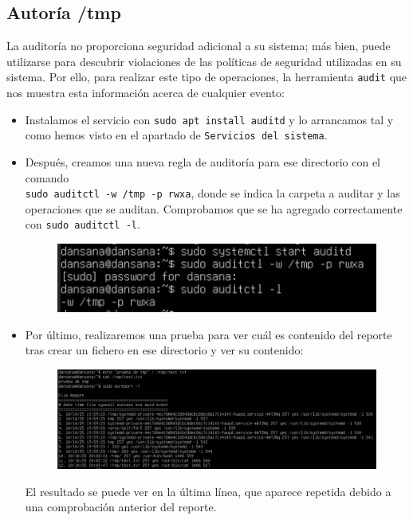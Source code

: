 \documentclass[10pt]{article}
\begin{document}
	\subsection{Autoría /tmp}
	La auditoría no proporciona seguridad adicional a su sistema; más bien, puede utilizarse para descubrir violaciones de las políticas de seguridad utilizadas en su sistema. Por ello, para realizar este tipo de operaciones, la herramienta \verb|audit| que nos muestra esta información acerca de cualquier evento:
	\begin{itemize}
		\item Instalamos el servicio con \verb|sudo apt install auditd| y lo arrancamos tal y como hemos visto en el apartado de \verb|Servicios del sistema|.
		\item Después, creamos una nueva regla de auditoría para ese directorio con el comando \\ \verb|sudo auditctl -w /tmp -p rwxa|, donde se indica la carpeta a auditar y las operaciones que se auditan. Comprobamos que se ha agregado correctamente con \verb|sudo auditctl -l|.
		\begin{figure}[H]
			\setlength{\abovecaptionskip}{0cm}
			\setlength{\belowcaptionskip}{0cm}
			\centering
			\includegraphics[width=0.7\linewidth]{Recursos/auditoriaTMP.png}
		\end{figure}
		\item Por último, realizaremos una prueba para ver cuál es contenido del reporte tras crear un fichero en ese directorio y ver su contenido:
		\begin{figure}[H]
			\setlength{\abovecaptionskip}{0cm}
			\setlength{\belowcaptionskip}{0cm}
			\centering
			\includegraphics[width=0.7\linewidth]{Recursos/testAudit.png}
		\end{figure}
		El resultado se puede ver en la última línea, que aparece repetida debido a una comprobación anterior del reporte.
	\end{itemize}
	
\end{document}
